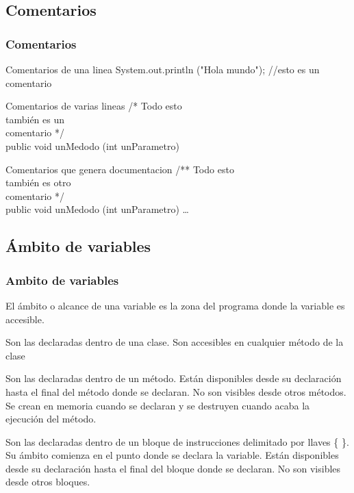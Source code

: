 \documentclass{beamer}
\begin{document}
\subsection{Comentarios} 

\begin{frame}
    \frametitle{Comentarios}
    \begin{block}{Comentarios de una linea}
	System.out.println ("Hola mundo"); //esto es un comentario
    \end{block}
    \pause
\begin{block}{Comentarios de varias lineas}
/* Todo esto \\
   también es un\\
   comentario */\\
public void unMedodo (int unParametro)
    \end{block}
    \pause
    \begin{block}{Comentarios que genera documentacion}
/** Todo esto\\
   también es otro\\
   comentario */\\
public void unMedodo (int unParametro) \dots
    \end{block}
    
\end{frame}

\subsection{Ámbito de variables}
\begin{frame}
\frametitle{Ambito de variables}
El ámbito o alcance de una variable es la zona del programa donde la variable es accesible.
\begin{description}[<+-| alert@+>]
\item[Variables miembro o atributos de una clase] Son las declaradas dentro de una clase. Son accesibles en cualquier método de la clase
\item[Variables locales] Son las declaradas dentro de un método. Están disponibles desde su declaración hasta el final del método donde se declaran.
No son visibles desde otros métodos. Se crean en memoria cuando se declaran y se destruyen cuando acaba la ejecución del método.
\item[Variables de bloque]  Son las declaradas dentro de un bloque de instrucciones delimitado por llaves \{ \}. Su ámbito comienza en el punto donde se declara la variable. Están disponibles desde su declaración hasta el final del bloque donde se declaran. No son visibles desde otros bloques.
\end{description}
\pause

\end{frame}
\end{document}
